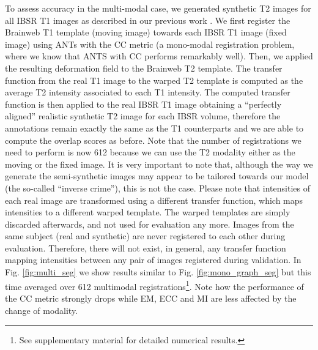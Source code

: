 To assess accuracy in the multi-modal case, we generated synthetic T2 images for all IBSR T1 images as described in our previous work \cite{Ocegueda2015}. We first register the Brainweb T1 template (moving image) towards each IBSR T1 image (fixed image) using ANTs with the CC metric (a mono-modal registration problem, where we know that ANTS with CC performs remarkably well). Then, we applied the resulting deformation field to the Brainweb T2 template. The transfer function from the real T1 image to the warped T2 template is computed as the average T2 intensity associated to each T1 intensity. The computed transfer function is then applied to the real IBSR T1 image obtaining a ``perfectly aligned'' realistic synthetic T2 image for each IBSR volume, therefore the annotations remain exactly the same as the T1 counterparts and we are able to compute the overlap scores as before. Note that the number of registrations we need to perform is now 612 because we can use the T2 modality either as the moving or the fixed image. It is very important to note that, although the way we generate the semi-synthetic images may appear to be tailored towards our model (the so-called ``inverse crime''), this is not the case. Please note that intensities of each real image are transformed using a different transfer function, which maps intensities to a different warped template. The warped templates are simply discarded afterwards, and not used for evaluation any more. Images from the same subject (real and synthetic) are never registered to each other during evaluation. Therefore, there will not exist, in general, any transfer function mapping intensities between any pair of images registered during validation. In Fig. \ref{fig:multi_seg} we show results similar to Fig. \ref{fig:mono_graph_seg} but this time averaged over 612 multimodal registrations\footnote{See supplementary material for detailed numerical results.}. Note how the performance of the CC metric strongly drops while EM, ECC and MI are less affected by the change of modality.\\

